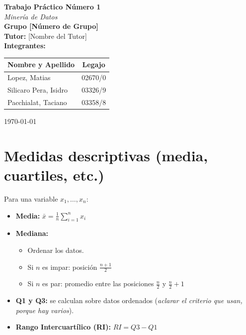 \documentclass[12pt, a4paper]{article}
\begin{document}
\begin{titlepage}
    \centering
    \vspace*{3cm}
    
    {\Huge \textbf{Trabajo Práctico Número 1}} \\[1cm]
    
    {\LARGE \textit{Minería de Datos}} \\[2cm]
    
    {\Large \textbf{Grupo [Número de Grupo]}} \\[0.5cm]
    
    {\Large \textbf{Tutor:} [Nombre del Tutor]} \\[2.5cm]
    
    {\Large \textbf{Integrantes:}} \\[0.5cm]
    \renewcommand{\arraystretch}{1.5}
    \begin{tabular}{|l|c|}
        \hline
        \textbf{Nombre y Apellido} & \textbf{Legajo} \\
        \hline
        Lopez, Matias & 02670/0 \\
        Silicaro Pera, Isidro & 03326/9 \\
        Pacchialat, Taciano & 03358/8 \\
        \hline
    \end{tabular}
    
    \vfill
    
    {\large \today}
    \vspace*{2cm}
\end{titlepage}


\section{Medidas descriptivas (media, cuartiles, etc.)}

Para una variable $x_1,\dots,x_n$:

\begin{itemize}
    \item \textbf{Media:} $\bar{x} = \frac{1}{n}\sum_{i=1}^{n} x_i$
    \item \textbf{Mediana:}
    \begin{itemize}
        \item Ordenar los datos.
        \item Si $n$ es impar: posición $\frac{n+1}{2}$
        \item Si $n$ es par: promedio entre las posiciones $\frac{n}{2}$ y $\frac{n}{2}+1$
    \end{itemize}
    \item \textbf{Q1 y Q3:} se calculan sobre datos ordenados (\textit{aclarar el criterio que usan, porque hay varios}).
    \item \textbf{Rango Intercuartílico (RI):} $RI = Q3 - Q1$
\end{itemize}
\end{document}
